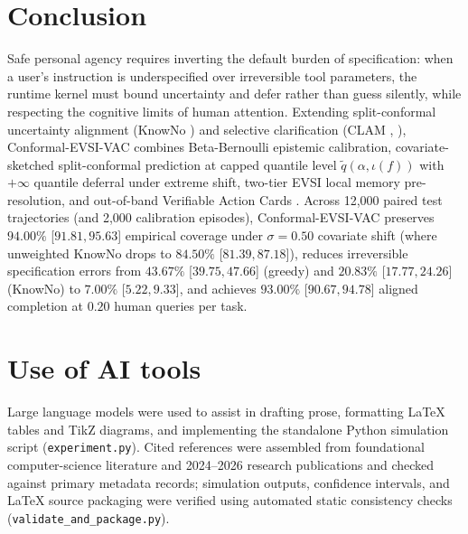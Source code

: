 \documentclass[11pt]{article}
\begin{document}
\section{Conclusion}\label{sec:conclusion}

Safe personal agency requires inverting the default burden of specification: when a user's instruction is underspecified over irreversible tool parameters, the runtime kernel must bound uncertainty and defer rather than guess silently, while respecting the cognitive limits of human attention. Extending split-conformal uncertainty alignment (KnowNo \citep{ren2023knowno}) and selective clarification (CLAM \citep{kuhn2023clam}, \citet{zhang2024clarify}), Conformal-EVSI-VAC combines Beta-Bernoulli epistemic calibration, covariate-sketched split-conformal prediction at capped quantile level $\tilde{q}(\alpha,\allowbreak \iota(f))$ with $+\infty$ quantile deferral under extreme shift, two-tier EVSI local memory pre-resolution, and out-of-band Verifiable Action Cards \citep{breckenridge2026ihitl}. Across 12{,}000 paired test trajectories (and 2{,}000 calibration episodes), Conformal-EVSI-VAC preserves $94.00\%$ [$91.81, 95.63$] empirical coverage under $\sigma=0.50$ covariate shift (where unweighted KnowNo drops to $84.50\%$ [$81.39, 87.18$]), reduces irreversible specification errors from $43.67\%$ [$39.75, 47.66$] (greedy) and $20.83\%$ [$17.77, 24.26$] (KnowNo) to $7.00\%$ [$5.22, 9.33$], and achieves $93.00\%$ [$90.67, 94.78$] aligned completion at $0.20$ human queries per task.

\section*{Use of AI tools}
Large language models were used to assist in drafting prose, formatting \LaTeX{} tables and TikZ diagrams, and implementing the standalone Python simulation script (\texttt{experiment.\linebreak[0]py}). Cited references were assembled from foundational computer-science literature and 2024--2026 research publications and checked against primary metadata records; simulation outputs, confidence intervals, and \LaTeX{} source packaging were verified using automated static consistency checks (\texttt{validate\_\linebreak[0]and\_\linebreak[0]package.\linebreak[0]py}).



\end{document}
